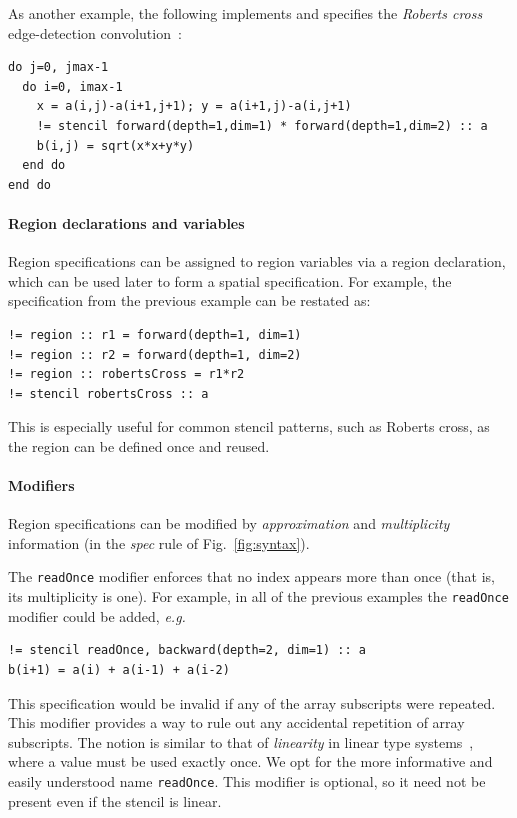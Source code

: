 \documentclass[9pt,preprint]{sigplanconf}
\theoremstyle{definition}
\newcommand{\eg}{\emph{e.g.}}
\begin{document}
As another example, the following
implements and specifies the \emph{Roberts cross}
edge-detection convolution~\cite{davis1975survey}:
\begin{verbatim}
do j=0, jmax-1
  do i=0, imax-1
    x = a(i,j)-a(i+1,j+1); y = a(i+1,j)-a(i,j+1)
    != stencil forward(depth=1,dim=1) * forward(depth=1,dim=2) :: a
    b(i,j) = sqrt(x*x+y*y)
  end do
end do
\end{verbatim}

\paragraph{Region declarations and variables}

Region specifications can be assigned to region variables via
a region declaration, which can be used later to form a spatial
specification. For example, the specification from the previous
 example can be restated as:
\begin{verbatim}
!= region :: r1 = forward(depth=1, dim=1)
!= region :: r2 = forward(depth=1, dim=2)
!= region :: robertsCross = r1*r2
!= stencil robertsCross :: a
\end{verbatim}
This is especially useful for common stencil patterns, such as Roberts cross,
as the region can be defined once and reused.
\paragraph{Modifiers}
Region specifications can be modified 
by \emph{approximation} and \emph{multiplicity} information 
(in the \textit{spec} rule of Fig.~\ref{fig:syntax}). 

The \texttt{readOnce} modifier enforces that no index appears more
than once (that is, its multiplicity is one). For example, in all of
the previous examples the \texttt{readOnce} modifier could be added,
\eg{}
%
\begin{verbatim}
!= stencil readOnce, backward(depth=2, dim=1) :: a
b(i+1) = a(i) + a(i-1) + a(i-2)
\end{verbatim}
%
This specification would be invalid if any of the
array subscripts were repeated. This modifier provides a way to
rule out any accidental repetition of array subscripts.
The notion is similar to that of \emph{linearity} in linear type
systems~\cite{wadler1990linear}, where a value must be used
exactly once. We opt for the more informative and easily understood name
\texttt{readOnce}. This modifier is optional, so it need not
be present even if the stencil is linear.
\end{document}
